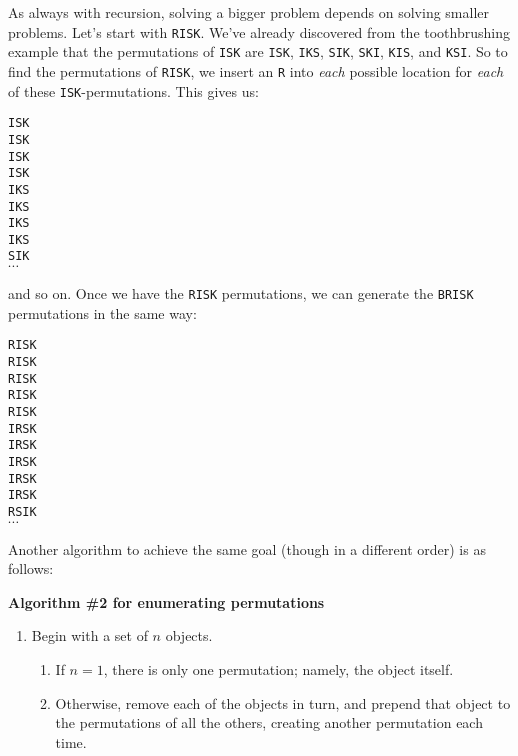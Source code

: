 As always with recursion, solving a bigger problem depends on solving
smaller problems. Let's start with \texttt{RISK}. We've already discovered
from the toothbrushing example that the permutations of \texttt{ISK} are
\texttt{ISK}, \texttt{IKS}, \texttt{SIK}, \texttt{SKI}, \texttt{KIS}, and
\texttt{KSI}. So to find the permutations of \texttt{RISK}, we insert an
\texttt{R} into \textit{each} possible location for \textit{each} of these
\texttt{ISK}-permutations. This gives us:
\begin{center}
\texttt{ISK} \\
\texttt{ISK} \\
\texttt{ISK} \\
\texttt{ISK} \\
\texttt{IKS} \\
\texttt{IKS} \\
\texttt{IKS} \\
\texttt{IKS} \\
\texttt{SIK} \\
$\cdots$
\end{center}
and so on. Once we have the \texttt{RISK} permutations, we can generate the
\texttt{BRISK} permutations in the same way:
\begin{center}
\texttt{RISK} \\
\texttt{RISK} \\
\texttt{RISK} \\
\texttt{RISK} \\
\texttt{RISK} \\
\texttt{IRSK} \\
\texttt{IRSK} \\
\texttt{IRSK} \\
\texttt{IRSK} \\
\texttt{IRSK} \\
\texttt{RSIK} \\
$\cdots$
\end{center}

Another algorithm to achieve the same goal (though in a different order) is
as follows:

\begin{nobreak}
\textbf{Algorithm \#2 for enumerating permutations}
\begin{enumerate}
\item Begin with a set of $n$ objects.
    \begin{enumerate}
    \item If $n=1$, there is only one permutation; namely, the object itself.
    \item Otherwise, remove each of the objects in turn, and prepend that
    object to the permutations of all the others, creating another permutation
    each time.
    \end{enumerate}
\end{enumerate}
\end{nobreak}


